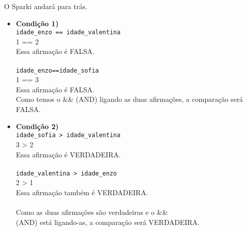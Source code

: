 \documentclass[conference]{IEEEtran}
\begin{document}
\par
O Sparki andará para trás.
\begin{itemize}
	\item \textbf{Condição 1)} \\
    \texttt{idade\_enzo == idade\_valentina} \\
	1 == 2 \\
	Essa afirmação é FALSA.\\
    \\
    \texttt{idade\_enzo==idade\_sofia}\\
    1 == 3 \\
    Essa afirmação é FALSA. \\
    
    Como temos o && (AND) ligando as duas afirmações, a comparação será FALSA.\\
    
	\item \textbf{Condição 2)} \\
    \texttt{idade\_sofia > idade\_valentina} \\
	3 > 2 \\
	Essa afirmação é VERDADEIRA.\\
    \\
    \texttt{idade\_valentina > idade\_enzo} \\
	2 > 1 \\
	Essa afirmação também é VERDADEIRA.\\
    \\
    Como as duas afirmações são verdadeiras e o \&\&\\ (AND) está ligando-as, a comparação será VERDADEIRA.
\end{itemize}
\end{document}

